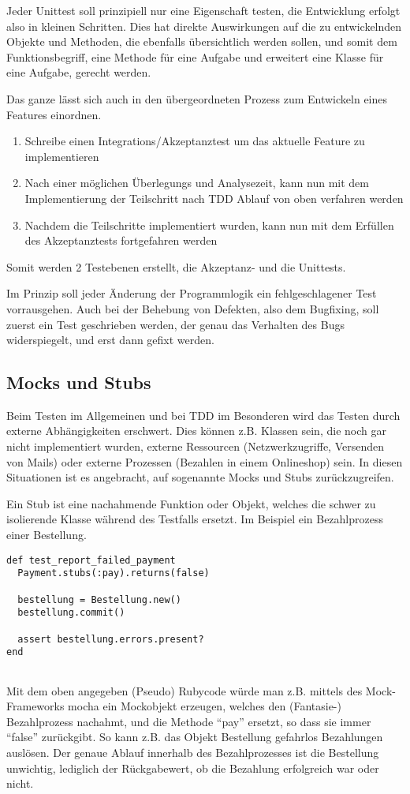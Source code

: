   Jeder Unittest soll prinzipiell nur eine Eigenschaft testen, die Entwicklung erfolgt also in kleinen Schritten. Dies hat direkte Auswirkungen auf die zu entwickelnden Objekte und Methoden, die ebenfalls übersichtlich werden sollen, und somit dem Funktionsbegriff, eine Methode für eine Aufgabe und erweitert eine Klasse für eine Aufgabe, gerecht werden.
  
  
  Das ganze lässt sich auch in den übergeordneten Prozess zum Entwickeln eines Features einordnen.
  \begin{enumerate}
   \item Schreibe einen Integrations/Akzeptanztest um das aktuelle Feature zu implementieren
   \item Nach einer möglichen Überlegungs und Analysezeit, kann nun mit dem Implementierung der Teilschritt nach TDD Ablauf von oben verfahren werden
   \item Nachdem die Teilschritte implementiert wurden, kann nun mit dem Erfüllen des Akzeptanztests fortgefahren werden
  \end{enumerate}
  
  Somit werden 2 Testebenen erstellt, die Akzeptanz- und die Unittests.

  Im Prinzip soll jeder Änderung der Programmlogik ein fehlgeschlagener Test vorrausgehen. Auch bei der Behebung von Defekten, also dem Bugfixing, soll zuerst ein Test geschrieben werden, der genau das Verhalten des Bugs widerspiegelt, und erst dann gefixt werden.
  
    
  \subsection{Mocks und Stubs}
  Beim Testen im Allgemeinen und bei TDD im Besonderen wird das Testen durch externe Abhängigkeiten erschwert. Dies können z.B. Klassen sein, die noch gar nicht implementiert wurden, externe Ressourcen (Netzwerkzugriffe, Versenden von Mails) oder externe Prozessen (Bezahlen in einem Onlineshop) sein. In diesen Situationen ist es angebracht, auf sogenannte Mocks und Stubs zurückzugreifen.
  
  Ein Stub ist eine nachahmende Funktion oder Objekt, welches die schwer zu isolierende Klasse während des Testfalls ersetzt. Im Beispiel ein Bezahlprozess einer Bestellung.
  \begin{lstlisting}
def test_report_failed_payment
  Payment.stubs(:pay).returns(false)
  
  bestellung = Bestellung.new()
  bestellung.commit()
  
  assert bestellung.errors.present?
end


  \end{lstlisting}
  Mit dem oben angegeben (Pseudo) Rubycode würde man z.B. mittels des Mock-Frameworks mocha ein Mockobjekt erzeugen, welches den (Fantasie-) Bezahlprozess nachahmt, und die Methode "`pay"' ersetzt, so dass sie immer "`false"' zurückgibt.
  So kann z.B. das Objekt Bestellung gefahrlos Bezahlungen auslösen. Der genaue Ablauf innerhalb des Bezahlprozesses ist die Bestellung unwichtig, lediglich der Rückgabewert, ob die Bezahlung erfolgreich war oder nicht.
  
